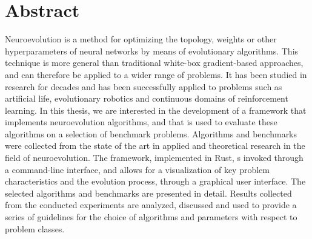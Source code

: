 \section*{Abstract}

Neuroevolution is a method for optimizing the topology, weights or other hyperparameters of neural networks by means of evolutionary algorithms.
This technique is more general than traditional white-box gradient-based approaches, and can therefore be applied to a wider range of
problems. It has been studied in research for decades and has been successfully applied to problems such as artificial life,
evolutionary robotics and continuous domains of reinforcement learning.
In this thesis, we are interested in the development of a framework that implements neuroevolution algorithms, and that is used to evaluate these algorithms on a
selection of benchmark problems. Algorithms and benchmarks were collected from the state of the art in applied and theoretical research in
the field of neuroevolution. The framework, implemented in Rust, s invoked through a command-line interface, and allows for a visualization of key problem
characteristics and the evolution process, through a graphical user interface. The selected algorithms and benchmarks are presented in detail. Results collected
from the conducted experiments are analyzed, discussed and used to provide a series of guidelines for the choice of algorithms and parameters with respect
to problem classes.

